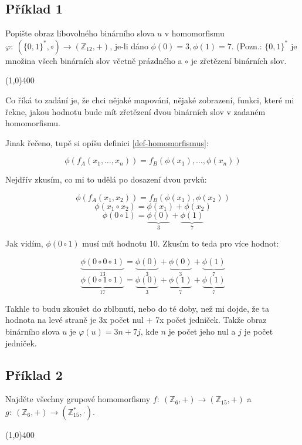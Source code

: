 \documentclass{article}
\begin{document}
\subsection{Příklad 1}
Popište obraz libovolného binárního slova $u$ v homomorfismu $\varphi: \: (\{0,1\}^*,\circ) \rightarrow (\mathbb{Z}_{12},+)$, je-li dáno $\phi(0) = 3, \phi(1) = 7$. (Pozn.: $\{0,1\}^*$ je množina všech binárních slov včetně prázdného a $\circ$ je zřetězení binárních slov.

\line(1,0){400}

Co říká to zadání je, že chci nějaké mapování, nějaké zobrazení, funkci, které mi řekne, jakou hodnotu bude mít zřetězení dvou binárních slov v zadaném homomorfismu.

Jinak řečeno, tupě si opíšu definici \ref{def-homomorfismus}:

\[ \phi(f_A(x_1, \ldots, x_n)) = f_B(\phi(x_1), \ldots, \phi(x_n)) \]

Nejdřív zkusím, co mi to udělá po dosazení dvou prvků:

\[ \phi(f_A(x_1,x_2)) = f_B(\phi(x_1), \phi(x_2)) \]
\[ \phi(x_1 \circ x_2) = \phi(x_1) + \phi(x_2) \]
\[ \phi(0 \circ 1) = \underbrace{\phi(0)}_{3} + \underbrace{\phi(1)}_{7} \]

Jak vidím, $\phi(0 \circ 1)$ musí mít hodnotu 10. Zkusím to teda pro více hodnot:

\[ \underbrace{\phi(0 \circ 0 \circ 1)}_{13} = \underbrace{\phi(0)}_{3} + \underbrace{\phi(0)}_{3} + \underbrace{\phi(1)}_{7} \]
\[ \underbrace{\phi(0 \circ 1 \circ 1)}_{17} = \underbrace{\phi(0)}_{3} + \underbrace{\phi(1)}_{7} + \underbrace{\phi(1)}_{7} \]

Takhle to budu zkoušet do zblbnutí, nebo do té doby, než mi dojde, že ta hodnota na levé straně je 3x počet nul + 7x počet jedniček. Takže obraz binárního slova $u$ je $\varphi(u) = 3n + 7j$, kde $n$ je počet jeho nul a $j$ je počet jedniček.


\subsection{Příklad 2}
Najděte všechny grupové homomorfismy $f: \: (\mathbb{Z}_{6},+) \rightarrow (\mathbb{Z}_{15},+)$ a $g: \: (\mathbb{Z}_{6},+) \rightarrow (\mathbb{Z}_{15}^*,\cdot)$.

\line(1,0){400}
\end{document}
